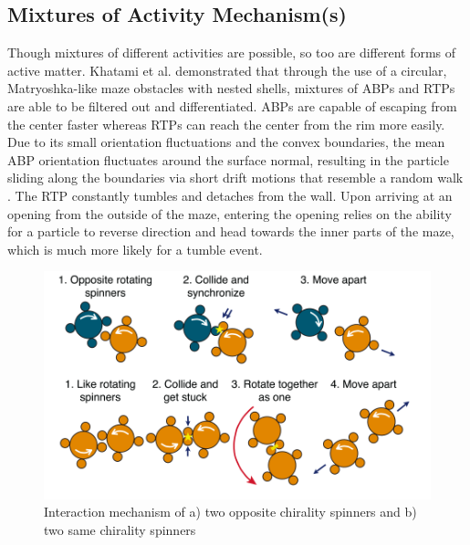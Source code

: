\documentclass[11pt]{article}
\begin{document}
\subsection{Mixtures of Activity Mechanism(s)}\label{propulsionmech}
Though mixtures of different activities are possible, so too are different forms of active matter.  Khatami et al. \cite{Khatami} demonstrated that through the use of a circular, Matryoshka-like maze obstacles with nested shells, mixtures of ABPs and RTPs are able to be filtered out and differentiated. ABPs are capable of escaping from the center faster whereas RTPs can reach the center from the rim more easily. Due to its small orientation fluctuations and the convex boundaries, the mean ABP orientation fluctuates around the surface normal, resulting in the particle sliding along the boundaries via short drift motions that resemble a random walk \cite{Fily}. The RTP constantly tumbles and detaches from the wall.  Upon arriving at an opening from the outside of the maze, entering the opening relies on the ability for a particle to reverse direction and head towards the inner parts of the maze, which is much more likely for a tumble event.


\begin{figure}[ht]
\centering\includegraphics[width=0.9\linewidth]{Screen Shot 2020-08-14 at 2.32.32 PM.png}
\caption{Interaction mechanism of a) two opposite chirality spinners and b) two same chirality spinners \cite{Nguyen}}
\label{fig:collide}
\end{figure}
\end{document}
